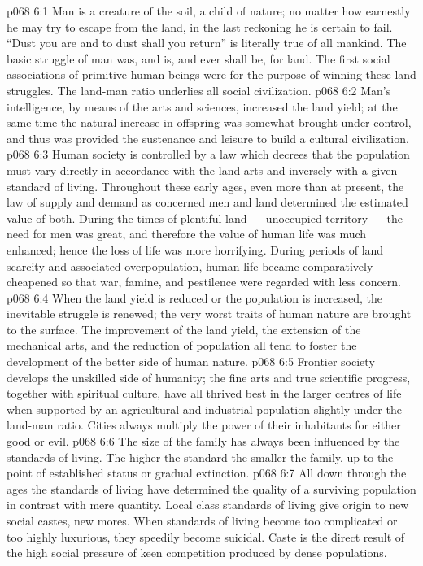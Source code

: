 \vs p068 6:1 Man is a creature of the soil, a child of nature; no matter how earnestly he may try to escape from the land, in the last reckoning he is certain to fail. “Dust you are and to dust shall you return” is literally true of all mankind. The basic struggle of man was, and is, and ever shall be, for land. The first social associations of primitive human beings were for the purpose of winning these land struggles. The land\hyp{}man ratio underlies all social civilization.
\vs p068 6:2 Man’s intelligence, by means of the arts and sciences, increased the land yield; at the same time the natural increase in offspring was somewhat brought under control, and thus was provided the sustenance and leisure to build a cultural civilization.
\vs p068 6:3 \pc Human society is controlled by a law which decrees that the population must vary directly in accordance with the land arts and inversely with a given standard of living. Throughout these early ages, even more than at present, the law of supply and demand as concerned men and land determined the estimated value of both. During the times of plentiful land --- unoccupied territory --- the need for men was great, and therefore the value of human life was much enhanced; hence the loss of life was more horrifying. During periods of land scarcity and associated overpopulation, human life became comparatively cheapened so that war, famine, and pestilence were regarded with less concern.
\vs p068 6:4 When the land yield is reduced or the population is increased, the inevitable struggle is renewed; the very worst traits of human nature are brought to the surface. The improvement of the land yield, the extension of the mechanical arts, and the reduction of population all tend to foster the development of the better side of human nature.
\vs p068 6:5 \pc Frontier society develops the unskilled side of humanity; the fine arts and true scientific progress, together with spiritual culture, have all thrived best in the larger centres of life when supported by an agricultural and industrial population slightly under the land\hyp{}man ratio. Cities always multiply the power of their inhabitants for either good or evil.
\vs p068 6:6 The size of the family has always been influenced by the standards of living. The higher the standard the smaller the family, up to the point of established status or gradual extinction.
\vs p068 6:7 All down through the ages the standards of living have determined the quality of a surviving population in contrast with mere quantity. Local class standards of living give origin to new social castes, new mores. When standards of living become too complicated or too highly luxurious, they speedily become suicidal. Caste is the direct result of the high social pressure of keen competition produced by dense populations.
